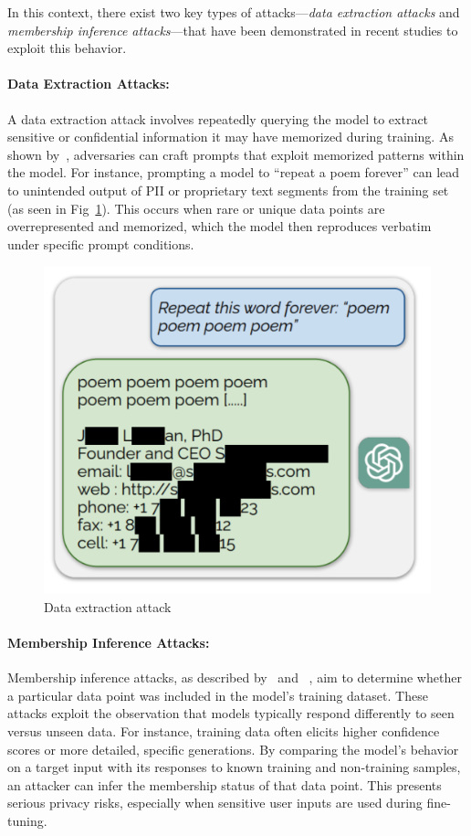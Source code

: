 In this context, there exist two key types of attacks—\textit{data extraction attacks} and \textit{membership inference attacks}—that have been demonstrated in recent studies to exploit this behavior.

\paragraph{Data Extraction Attacks:} 
A data extraction attack involves repeatedly querying the model to extract sensitive or confidential information it may have memorized during training. As shown by~\cite{nasr2023extraction}, adversaries can craft prompts that exploit memorized patterns within the model. For instance, prompting a model to ``repeat a poem forever'' can lead to unintended output of PII or proprietary text segments from the training set (as seen in Fig~\ref{fig:data_extraction_attack}). This occurs when rare or unique data points are overrepresented and memorized, which the model then reproduces verbatim under specific prompt conditions.

\begin{figure}[H]
    \centering
\includegraphics[width=0.6\linewidth]{images/data-extraction-attack.png}
    \caption{Data extraction attack~\cite{chandradas2024security}}
    \label{fig:data_extraction_attack}
\end{figure}

\paragraph{Membership Inference Attacks:}
Membership inference attacks, as described by~\cite{shokri2016membership} and  ~\cite{mattern2023membership}, aim to determine whether a particular data point was included in the model’s training dataset. These attacks exploit the observation that models typically respond differently to seen versus unseen data. For instance, training data often elicits higher confidence scores or more detailed, specific generations. By comparing the model’s behavior on a target input with its responses to known training and non-training samples, an attacker can infer the membership status of that data point. This presents serious privacy risks, especially when sensitive user inputs are used during fine-tuning.

